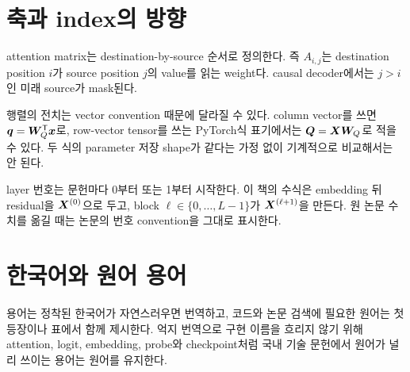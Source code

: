 \section{축과 index의 방향}

attention matrix는 destination-by-source 순서로 정의한다.
즉 $A_{i,j}$는 destination position $i$가 source position $j$의 value를 읽는 weight다.
causal decoder에서는 $j>i$인 미래 source가 mask된다.

행렬의 전치는 vector convention 때문에 달라질 수 있다.
column vector를 쓰면 $\bm{q}=\bm{W}_Q^{\mathsf T}\bm{x}$로, row-vector tensor를 쓰는 PyTorch식 표기에서는 $\bm{Q}=\bm{X}\bm{W}_Q$로 적을 수 있다.
두 식의 parameter 저장 shape가 같다는 가정 없이 기계적으로 비교해서는 안 된다.

layer 번호는 문헌마다 0부터 또는 1부터 시작한다.
이 책의 수식은 embedding 뒤 residual을 $\bm{X}^{(0)}$으로 두고, block $\ell\in\{0,\ldots,L-1\}$가 $\bm{X}^{(\ell+1)}$을 만든다.
원 논문 수치를 옮길 때는 논문의 번호 convention을 그대로 표시한다.

\section{한국어와 원어 용어}

용어는 정착된 한국어가 자연스러우면 번역하고, 코드와 논문 검색에 필요한 원어는 첫 등장이나 표에서 함께 제시한다.
억지 번역으로 구현 이름을 흐리지 않기 위해 attention, logit, embedding, probe와 checkpoint처럼 국내 기술 문헌에서 원어가 널리 쓰이는 용어는 원어를 유지한다.

